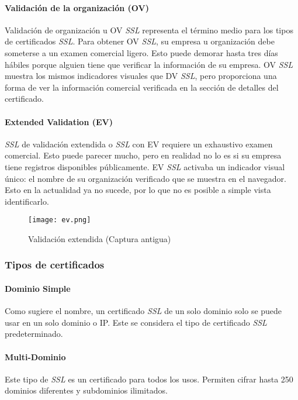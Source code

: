 \paragraph*{Validación de la organización (OV)}
Validación de organización u OV \emph{SSL} representa el término medio para los tipos de 
certificados \emph{SSL}. Para obtener OV \emph{SSL}, su empresa u organización debe someterse a 
un examen comercial ligero. Esto puede demorar hasta tres días hábiles porque alguien 
tiene que verificar la información de su empresa. OV \emph{SSL} muestra los mismos indicadores 
visuales que DV \emph{SSL}, pero proporciona una forma de ver la 
información comercial verificada en la sección de detalles del certificado. 

\paragraph*{Extended Validation (EV)}
\emph{SSL} de validación extendida o \emph{SSL} con EV requiere un exhaustivo examen comercial. 
Esto puede parecer mucho, pero en realidad no lo es si su empresa tiene 
registros disponibles públicamente. EV \emph{SSL} activaba un indicador visual único: el 
nombre de su organización verificado que se muestra en el navegador. Esto en la 
actualidad ya no sucede, por lo que no es posible a simple vista identificarlo.

\begin{center}
   \begin{figure}   
      \begin{center}
         \texttt{[image: ev.png]}
      \end{center}
      \caption{Validación extendida (Captura antigua)}
   \end{figure}
\end{center}

  \subsubsection*{Tipos de certificados}

  \paragraph*{Dominio Simple}
  Como sugiere el nombre, un certificado \emph{SSL} de un solo dominio solo 
  se puede usar en un solo dominio o IP. Este se considera el tipo de 
  certificado \emph{SSL} predeterminado. 
  
  \paragraph*{Multi-Dominio}
  Este tipo de \emph{SSL} es un certificado para todos los usos. Permiten cifrar 
  hasta 250 dominios diferentes y subdominios 
  ilimitados. 
  
